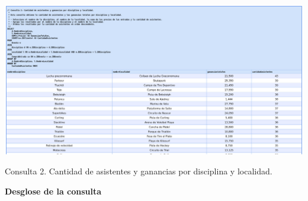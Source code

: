 \begin{center}
    \includegraphics[width=16.5cm]{resources/Chapters/Consultas/Imagenes/Consulta2.jpeg} 
    
   Consulta 2. Cantidad de asistentes y ganancias por disciplina y localidad. 
\end{center}

\textbf{Desglose de la consulta}

